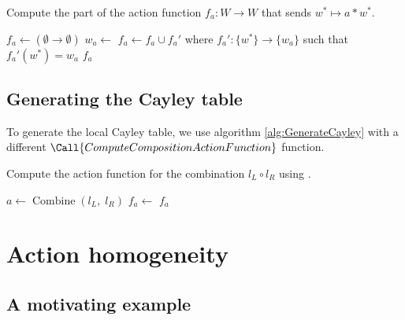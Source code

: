 \begin{algorithm}[H]
	\caption{
		Compute the part of the action function $f_{a}: W \to W$ that sends $w^{*} \mapsto a \ast w^{*}$.
	}
	\hrulefill
	\begin{algorithmic}[1]
		\State $f_{a} \gets (\emptyset \to \emptyset)$
		\State $w_{a} \gets$ 
		\State $f_{a} \gets f_{a} \cup f_{a}'$ where $f_{a}': \{w^{*}\} \to \{w_{a}\}$ such that $f_{a}'(w^{*}) = w_{a}$
		\State \Return $f_{a}$
		\EndProcedure
	\end{algorithmic}
\end{algorithm}

\subsection{Generating the Cayley table}

To generate the local Cayley table, we use algorithm \ref{alg:GenerateCayley} with a different $\Call{ComputeCompositionActionFunction}$ function.

\begin{algorithm}[H]
	\caption{
		Compute the action function for the combination $l_{L} \circ l_{R}$ using .
	}
	\hrulefill
	\begin{algorithmic}[1]
		      \State $a \gets \operatorname{Combine}(l_{L}, \; l_{R})$
                \State $f_{a} \gets$ 
                \State \Return $f_{a}$
		\EndProcedure
	\end{algorithmic}
\end{algorithm}



\section{
Action homogeneity
}
\subsection{
A motivating example
}


